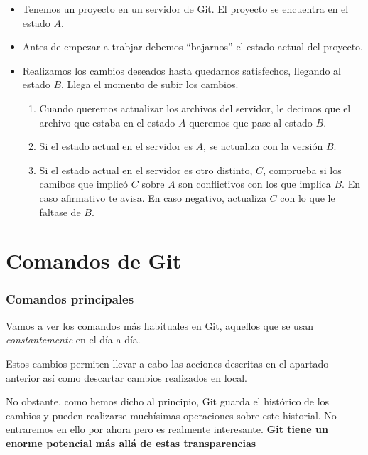 \documentclass[10pt,compress,usetitleprogressbar,aspectratio=1610,mathserif,notes]{beamer}
\begin{document}
\begin{frame}
\begin{itemize}
\item Tenemos un proyecto en un servidor de Git. El proyecto se encuentra en el estado $A$.
\item Antes de empezar a trabjar debemos ``bajarnos'' el estado actual del proyecto.
\item Realizamos los cambios deseados hasta quedarnos satisfechos, llegando al estado $B$. Llega el momento de subir los cambios.
\begin{enumerate}
\item Cuando queremos actualizar los archivos del servidor, le decimos que el archivo que estaba en el estado $A$ queremos que pase al estado $B$.
\item Si el estado actual en el servidor es $A$, se actualiza con la versión $B$.
\item Si el estado actual en el servidor es otro distinto, $C$, comprueba si los camibos que implicó $C$ sobre $A$ son conflictivos con los que implica $B$. En caso afirmativo te avisa. En caso negativo, actualiza $C$ con lo que le faltase de $B$.
\end{enumerate}
\end{itemize}

\end{frame}

\section{Comandos de Git}
\begin{frame}
\frametitle{Comandos principales}
Vamos a ver los comandos más habituales en Git, aquellos que se usan \textit{constantemente} en el día a día.

Estos cambios permiten llevar a cabo las acciones descritas en el apartado anterior así como descartar cambios realizados en local.

No obstante, como hemos dicho al principio, Git guarda el histórico de los cambios y pueden realizarse muchísimas operaciones sobre este historial. No entraremos en ello por ahora pero es realmente interesante. \textbf{Git tiene un enorme potencial más allá de estas transparencias}
\end{frame}
\end{document}
